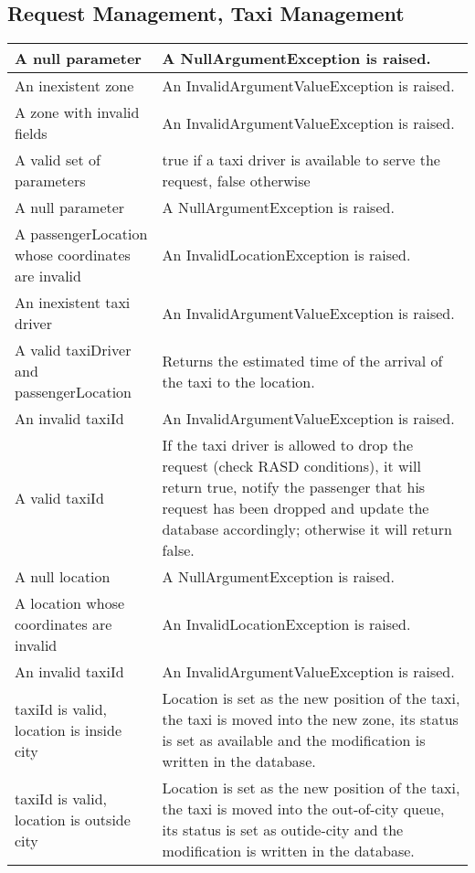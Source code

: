 \subsection{Request Management, Taxi Management}
\begin{tabular}{p{5cm}|p{6cm}}
\hline
	\method{existsAvailableTaxiDriver(request, zone)}
	A null parameter &
	A NullArgumentException is raised. \\\hline
	An inexistent zone &
	An InvalidArgumentValueException is raised. \\\hline
	A zone with invalid fields &
	An InvalidArgumentValueException  is raised. \\\hline
	A valid set of parameters &
	true if a taxi driver is available to serve the request, false otherwise \\\hline\hline
	
	\method{getETA(taxiDriver, passengerLocation)}
	A null parameter &
	A NullArgumentException is raised. \\\hline
	A passengerLocation whose coordinates are invalid &
	An InvalidLocationException is raised. \\\hline
	An inexistent taxi driver &
	An InvalidArgumentValueException is raised. \\\hline
	A valid taxiDriver and passengerLocation &
	Returns the estimated time of the arrival of the taxi to the location. \\\hline\hline

	\method{taxiDriverDroppedRequest(taxiId)}
	An invalid taxiId &
	An InvalidArgumentValueException is raised. \\\hline
	A valid taxiId &
	If the taxi driver is allowed to drop the request (check RASD conditions), it will return true, notify the passenger that his request has been dropped and update the database accordingly; otherwise it will return false.  \\\hline	
	\method{sendCurrentLocation(taxiId, location)}
	A null location &
	A NullArgumentException is raised. \\\hline
	A location whose coordinates are invalid &
	An InvalidLocationException is raised. \\\hline
	An invalid taxiId &
	An InvalidArgumentValueException is raised. \\\hline
	taxiId is valid, location is inside city&
	Location is set as the new position of the taxi, the taxi is moved into the new zone, its status is set as available and the modification is written in the database.\\\hline
	taxiId is valid, location is outside city&
	Location is set as the new position of the taxi, the taxi is moved into the out-of-city queue, its status is set as outide-city and the modification is written in the database. \\\hline\hline
\end{tabular}


